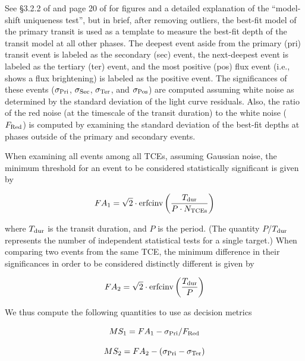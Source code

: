 See \S3.2.2 of \citet{Rowe2015a} and page 20 of \citet{Coughlin2014b} for figures and a detailed explanation of the ``model-shift uniqueness test'', but in brief, after removing outliers, the best-fit model of the primary transit is used as a template to measure the best-fit depth of the transit model at all other phases. The deepest event aside from the primary (pri) transit event is labeled as the secondary (sec) event, the next-deepest event is labeled as the tertiary (ter) event, and the most positive (pos) flux event (i.e., shows a flux brightening) is labeled as the positive event. The significances of these events ($\sigma_{\rm Pri}$, $\sigma_{\rm Sec}$, $\sigma_{\rm Ter}$, and $\sigma_{\rm Pos}$) are computed assuming white noise as determined by the standard deviation of the light curve residuals. Also, the ratio of the red noise (at the timescale of the transit duration) to the white noise ($F_{\rm Red}$) is computed by examining the standard deviation of the best-fit depths at phases outside of the primary and secondary events.  

When examining all events among all TCEs, assuming Gaussian noise, the minimum threshold for an event to be considered statistically significant is given by

\begin{equation}
    FA_{1} = \sqrt{2}\cdot \textrm{erfcinv}\left(\frac{T_{\rm dur}}{P \cdot N_{\rm TCEs}}\right)
\end{equation}

\noindent where $T_{\rm dur}$ is the transit duration, and $P$ is the period. (The quantity $P$/$T_{\rm dur}$ represents the number of independent statistical tests for a single target.) When comparing two events from the same TCE, the minimum difference in their significances in order to be considered distinctly different is given by

\begin{equation}
    FA_{2} = \sqrt{2}\cdot \textrm{erfcinv}\left(\frac{T_{\rm dur}}{P}\right)
\end{equation}

\noindent We thus compute the following quantities to use as decision metrics

\begin{equation}
    MS_{1} = FA_{1} - \sigma_{\rm Pri}/F_{\rm Red}
\end{equation}

\begin{equation}
    MS_{2} = FA_{2} - (\sigma_{\rm Pri} - \sigma_{\rm Ter})
\end{equation}

